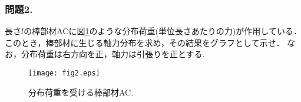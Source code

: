 \documentclass[10pt,a4j]{jarticle}
\begin{document}
\subsubsection*{問題2.} 
長さ$l$の棒部材ACに図\ref{fig:fig2}のような分布荷重(単位長さあたりの力)が作用している．
このとき，棒部材に生じる軸力分布を求め，その結果をグラフとして示せ．
なお，分布荷重は右方向を正，軸力は引張りを正とする.
\begin{figure}[h]
	\begin{center}
	\texttt{[image: fig2.eps]} 
	\end{center}
	\vspace{-5mm}
	\caption{分布荷重を受ける棒部材AC.} 
	\label{fig:fig2}
\end{figure}
\end{document}
